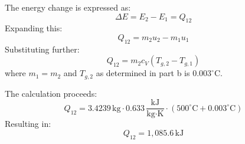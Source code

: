 The energy change is expressed as:  
\[
\Delta E = E_2 - E_1 = Q_{12}
\]  
Expanding this:  
\[
Q_{12} = m_2 u_2 - m_1 u_1
\]  
Substituting further:  
\[
Q_{12} = m_2 c_V (T_{g,2} - T_{g,1})
\]  
where \( m_1 = m_2 \) and \( T_{g,2} \) as determined in part b is \( 0.003^\circ\text{C} \).  

The calculation proceeds:  
\[
Q_{12} = 3.4239 \, \text{kg} \cdot 0.633 \, \frac{\text{kJ}}{\text{kg·K}} \cdot (500^\circ\text{C} + 0.003^\circ\text{C})
\]  
Resulting in:  
\[
Q_{12} = 1,085.6 \, \text{kJ}
\]